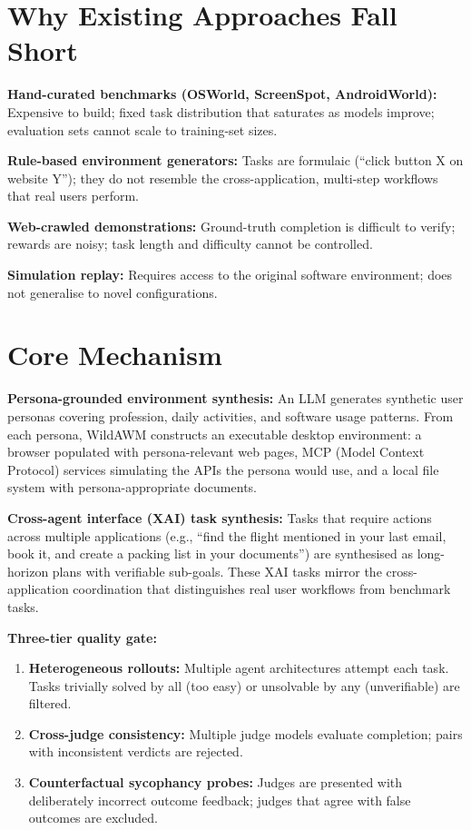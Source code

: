 \documentclass[10pt,twocolumn]{article}
\begin{document}
\section{Why Existing Approaches Fall Short}

\textbf{Hand-curated benchmarks (OSWorld, ScreenSpot, AndroidWorld):}
Expensive to build; fixed task distribution that saturates as models
improve; evaluation sets cannot scale to training-set sizes.

\textbf{Rule-based environment generators:} Tasks are formulaic (``click
button X on website Y''); they do not resemble the cross-application,
multi-step workflows that real users perform.

\textbf{Web-crawled demonstrations:} Ground-truth completion is difficult
to verify; rewards are noisy; task length and difficulty cannot be controlled.

\textbf{Simulation replay:} Requires access to the original software
environment; does not generalise to novel configurations.

\section{Core Mechanism}

\textbf{Persona-grounded environment synthesis:} An LLM generates synthetic
user personas covering profession, daily activities, and software usage
patterns. From each persona, WildAWM constructs an executable desktop
environment: a browser populated with persona-relevant web pages, MCP
(Model Context Protocol) services simulating the APIs the persona would
use, and a local file system with persona-appropriate documents.

\textbf{Cross-agent interface (XAI) task synthesis:} Tasks that require
actions across multiple applications (e.g., ``find the flight mentioned
in your last email, book it, and create a packing list in your documents'')
are synthesised as long-horizon plans with verifiable sub-goals. These
XAI tasks mirror the cross-application coordination that distinguishes
real user workflows from benchmark tasks.

\textbf{Three-tier quality gate:}
\begin{enumerate}[itemsep=2pt,parsep=0pt]
  \item \textbf{Heterogeneous rollouts:} Multiple agent architectures
    attempt each task. Tasks trivially solved by all (too easy) or
    unsolvable by any (unverifiable) are filtered.
  \item \textbf{Cross-judge consistency:} Multiple judge models evaluate
    completion; pairs with inconsistent verdicts are rejected.
  \item \textbf{Counterfactual sycophancy probes:} Judges are presented
    with deliberately incorrect outcome feedback; judges that agree with
    false outcomes are excluded.
\end{enumerate}
\end{document}
